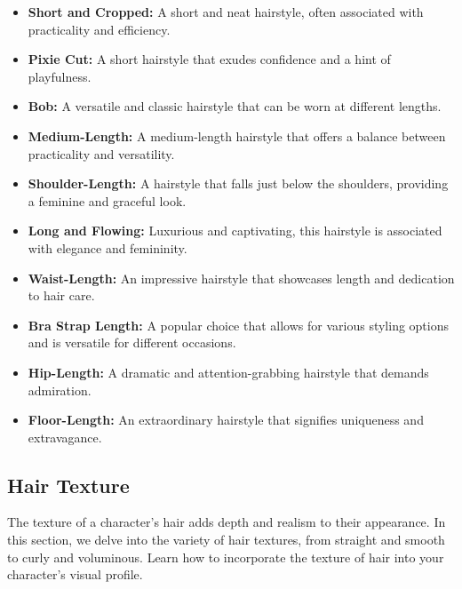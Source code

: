 \documentclass[12pt]{book}
\begin{document}
\begin{itemize}
    \item \textbf{Short and Cropped:} A short and neat hairstyle, often associated with practicality and efficiency.
    \item \textbf{Pixie Cut:} A short hairstyle that exudes confidence and a hint of playfulness.
    \item \textbf{Bob:} A versatile and classic hairstyle that can be worn at different lengths.
    \item \textbf{Medium-Length:} A medium-length hairstyle that offers a balance between practicality and versatility.
    \item \textbf{Shoulder-Length:} A hairstyle that falls just below the shoulders, providing a feminine and graceful look.
    \item \textbf{Long and Flowing:} Luxurious and captivating, this hairstyle is associated with elegance and femininity.
    \item \textbf{Waist-Length:} An impressive hairstyle that showcases length and dedication to hair care.
    \item \textbf{Bra Strap Length:} A popular choice that allows for various styling options and is versatile for different occasions.
    \item \textbf{Hip-Length:} A dramatic and attention-grabbing hairstyle that demands admiration.
    \item \textbf{Floor-Length:} An extraordinary hairstyle that signifies uniqueness and extravagance.
\end{itemize}

\subsection{\textbf{Hair Texture}}

The texture of a character's hair adds depth and realism to their appearance. In this section, we delve into the variety of hair textures, from straight and smooth to curly and voluminous. Learn how to incorporate the texture of hair into your character's visual profile.
\end{document}
